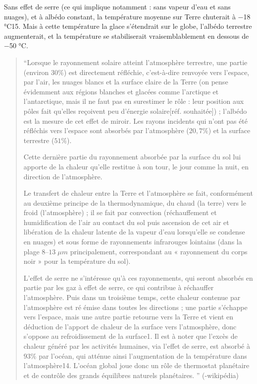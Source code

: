 \documentclass[11pt,a4paper]{article}
\begin{document}
\begin{table}
\begin{rmrq}
\small{Sans effet de serre (ce qui implique notamment : sans vapeur d'eau et sans nuages), et à albédo constant, la température moyenne sur Terre chuterait à −18 °C15. Mais à cette température la glace s'étendrait sur le globe, l'albédo terrestre augmenterait, et la température se stabiliserait vraisemblablement en dessous de −50 °C.}
\end{rmrq}
\end{table}
\begin{quote}
    ``Lorsque le rayonnement solaire atteint l'atmosphère terrestre, une partie (environ $30 \%$) est directement réfléchie, c'est-à-dire renvoyée vers l'espace, par l'air, les nuages blancs et la surface claire de la Terre (on pense évidemment aux régions blanches et glacées comme l'arctique et l'antarctique, mais il ne faut pas en surestimer le rôle : leur position aux pôles fait qu'elles reçoivent peu d'énergie solaire[réf. souhaitée]) ; l'albédo est la mesure de cet effet de miroir. Les rayons incidents qui n'ont pas été réfléchis vers l'espace sont absorbés par l'atmosphère ($20,7 \%$) et la surface terrestre ($51\%$).
    
    Cette dernière partie du rayonnement absorbée par la surface du sol lui apporte de la chaleur qu'elle restitue à son tour, le jour comme la nuit, en direction de l'atmosphère. 
    
    Le transfert de chaleur entre la Terre et l'atmosphère se fait, conformément au deuxième principe de la thermodynamique, du chaud (la terre) vers le froid (l'atmosphère) ; il se fait par convection (réchauffement et humidification de l'air au contact du sol puis ascension de cet air et libération de la chaleur latente de la vapeur d'eau lorsqu'elle se condense en nuages) et sous forme de rayonnements infrarouges lointains (dans la plage $8–13\; \mu m $ principalement, correspondant au « rayonnement du corps noir » pour la température du sol). 
    
    L'effet de serre ne s'intéresse qu'à ces rayonnements, qui seront absorbés en partie par les gaz à effet de serre, ce qui contribue à réchauffer l'atmosphère. Puis dans un troisième temps, cette chaleur contenue par l'atmosphère est ré émise dans toutes les directions ; une partie s'échappe vers l'espace, mais une autre partie retourne vers la Terre et vient en déduction de l'apport de chaleur de la surface vers l'atmosphère, donc s'oppose au refroidissement de la surface1. Il est à noter que l'excès de chaleur généré par les activités humaines, via l’effet de serre, est absorbé à $93\%$ par l'océan, qui atténue ainsi l'augmentation de la température dans l'atmosphère14. L'océan global joue donc un rôle de thermostat planétaire et de contrôle des grands équilibres naturels planétaires. '' (-wikipédia)
\end{quote}
\end{document}
